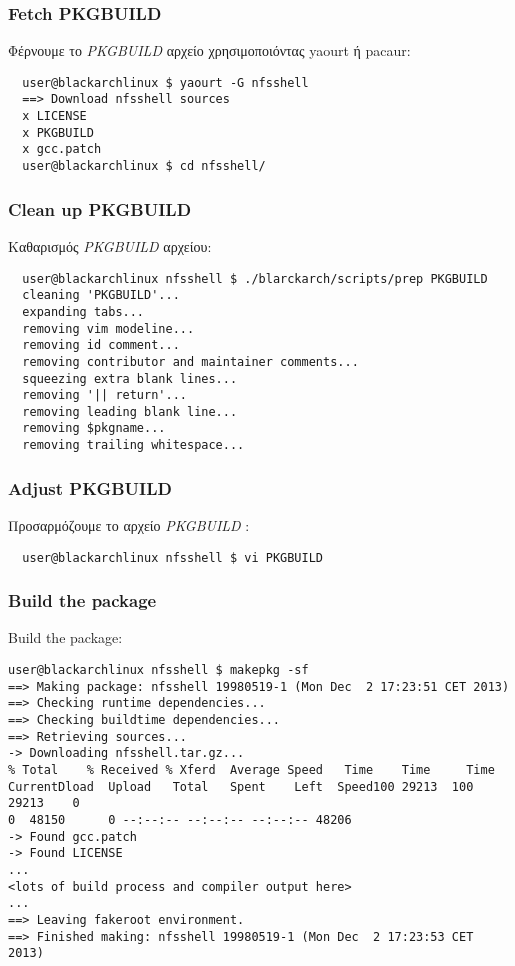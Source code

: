 \documentclass[a4paper, oneside, 11pt]{book}
\begin{document}
\subsubsection{Fetch PKGBUILD}
Φέρνουμε το \textit{PKGBUILD} αρχείο χρησιμοποιόντας yaourt ή pacaur:
\begin{lstlisting}
  user@blackarchlinux $ yaourt -G nfsshell
  ==> Download nfsshell sources
  x LICENSE
  x PKGBUILD
  x gcc.patch
  user@blackarchlinux $ cd nfsshell/
\end{lstlisting}

\subsubsection{Clean up PKGBUILD}
Καθαρισμός \textit{PKGBUILD} αρχείου:
\begin{lstlisting}
  user@blackarchlinux nfsshell $ ./blarckarch/scripts/prep PKGBUILD
  cleaning 'PKGBUILD'...
  expanding tabs...
  removing vim modeline...
  removing id comment...
  removing contributor and maintainer comments...
  squeezing extra blank lines...
  removing '|| return'...
  removing leading blank line...
  removing $pkgname...
  removing trailing whitespace...
\end{lstlisting}

\subsubsection{Adjust PKGBUILD}
Προσαρμόζουμε το αρχείο \textit{PKGBUILD} :
\begin{lstlisting}
  user@blackarchlinux nfsshell $ vi PKGBUILD
\end{lstlisting}

\subsubsection{Build the package}
Build the package:
\begin{lstlisting}user@blackarchlinux nfsshell $ makepkg -sf
==> Making package: nfsshell 19980519-1 (Mon Dec  2 17:23:51 CET 2013)
==> Checking runtime dependencies...
==> Checking buildtime dependencies...
==> Retrieving sources...
-> Downloading nfsshell.tar.gz...
% Total    % Received % Xferd  Average Speed   Time    Time     Time
CurrentDload  Upload   Total   Spent    Left  Speed100 29213  100 29213    0
0  48150      0 --:--:-- --:--:-- --:--:-- 48206
-> Found gcc.patch
-> Found LICENSE
...
<lots of build process and compiler output here>
...
==> Leaving fakeroot environment.
==> Finished making: nfsshell 19980519-1 (Mon Dec  2 17:23:53 CET 2013)
\end{lstlisting}
\end{document}
